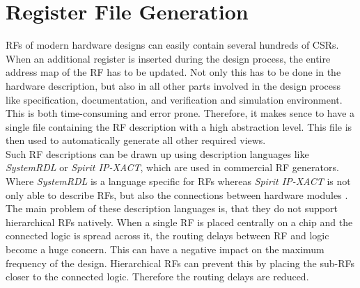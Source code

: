 \section{Register File Generation}\label{rf_generation}
RFs of modern hardware designs can easily contain several hundreds of CSRs. When an additional register is inserted during the design process, the entire address map of the RF has to be updated. Not only this has to be done in the hardware description, but also in all other parts involved in the design process like specification, documentation, and verification and simulation environment. This is both time-consuming and error prone. Therefore, it makes sence to have a single file containing the RF description with a high abstraction level. This file is then used to automatically generate all other required views.\\

Such RF descriptions can be drawn up using description languages like \emph{SystemRDL} or \emph{Spirit IP-XACT}, which are used in commercial RF generators. Where \emph{SystemRDL} is a language specific for RFs \cite{system_rdl} whereas \emph{Spirit IP-XACT} is not only able to describe RFs, but also the connections between hardware modules \cite{ip_xact}.\\

The main problem of these description languages is, that they do not support hierarchical RFs natively. When a single RF is placed centrally on a chip and the connected logic is spread across it, the routing delays between RF and logic become a huge concern. This can have a negative impact on the maximum frequency of the design. Hierarchical RFs can prevent this by placing the sub-RFs closer to the connected logic. Therefore the routing delays are reduced.